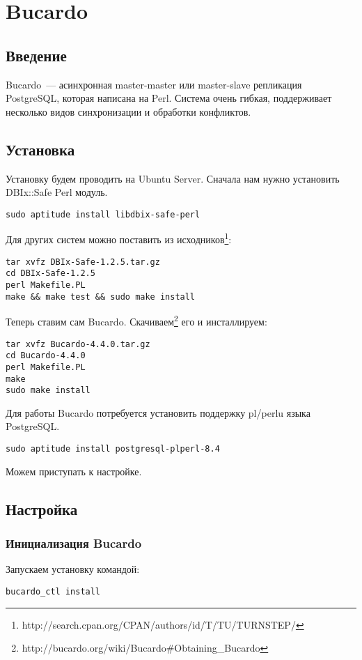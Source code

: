 \section{Bucardo}
\subsection{Введение}
Bucardo~--- асинхронная master-master или master-slave репликация PostgreSQL, которая написана на Perl.
Система очень гибкая, поддерживает несколько видов синхронизации и обработки конфликтов.

\subsection{Установка}
Установку будем проводить на Ubuntu Server. Сначала нам нужно установить DBIx::Safe Perl модуль.
\begin{lstlisting}[label=lst:bucardo1,caption=Установка]
sudo aptitude install libdbix-safe-perl
\end{lstlisting}

Для других систем можно поставить из исходников\footnote{http://search.cpan.org/CPAN/authors/id/T/TU/TURNSTEP/}:
\begin{lstlisting}[label=lst:bucardo2,caption=Установка]
tar xvfz DBIx-Safe-1.2.5.tar.gz
cd DBIx-Safe-1.2.5
perl Makefile.PL
make && make test && sudo make install
\end{lstlisting}

Теперь ставим сам Bucardo. Скачиваем\footnote{http://bucardo.org/wiki/Bucardo\#Obtaining\_Bucardo} его и инсталлируем:
\begin{lstlisting}[label=lst:bucardo3,caption=Установка]
tar xvfz Bucardo-4.4.0.tar.gz
cd Bucardo-4.4.0
perl Makefile.PL
make
sudo make install
\end{lstlisting}

Для работы Bucardo потребуется установить поддержку pl/perlu языка PostgreSQL.
\begin{lstlisting}[label=lst:bucardo4,caption=Установка]
sudo aptitude install postgresql-plperl-8.4
\end{lstlisting}

Можем приступать к настройке.

\subsection{Настройка}
\subsubsection{Инициализация Bucardo}
Запускаем установку командой:
\begin{lstlisting}[label=lst:bucardo5,caption=Инициализация Bucardo]
bucardo_ctl install
\end{lstlisting}

